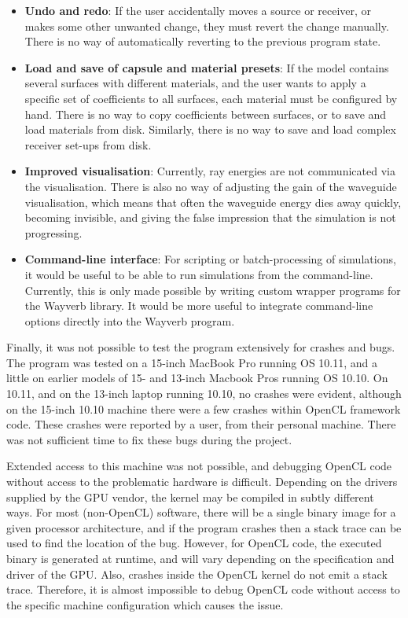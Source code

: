 \documentclass[]{scrreprt}
\providecommand{\tightlist}{%
  \setlength{\itemsep}{0pt}\setlength{\parskip}{0pt}}
\begin{document}
\begin{itemize}
\tightlist
\item
  \textbf{Undo and redo}: If the user accidentally moves a source or
  receiver, or makes some other unwanted change, they must revert the
  change manually. There is no way of automatically reverting to the
  previous program state.
\item
  \textbf{Load and save of capsule and material presets}: If the model
  contains several surfaces with different materials, and the user wants
  to apply a specific set of coefficients to all surfaces, each material
  must be configured by hand. There is no way to copy coefficients
  between surfaces, or to save and load materials from disk. Similarly,
  there is no way to save and load complex receiver set-ups from disk.
\item
  \textbf{Improved visualisation}: Currently, ray energies are not
  communicated via the visualisation. There is also no way of adjusting
  the gain of the waveguide visualisation, which means that often the
  waveguide energy dies away quickly, becoming invisible, and giving the
  false impression that the simulation is not progressing.
\item
  \textbf{Command-line interface}: For scripting or batch-processing of
  simulations, it would be useful to be able to run simulations from the
  command-line. Currently, this is only made possible by writing custom
  wrapper programs for the Wayverb library. It would be more useful to
  integrate command-line options directly into the Wayverb program.
\end{itemize}

Finally, it was not possible to test the program extensively for crashes
and bugs. The program was tested on a 15-inch MacBook Pro running OS
10.11, and a little on earlier models of 15- and 13-inch Macbook Pros
running OS 10.10. On 10.11, and on the 13-inch laptop running 10.10, no
crashes were evident, although on the 15-inch 10.10 machine there were a
few crashes within OpenCL framework code. These crashes were reported by
a user, from their personal machine. There was not sufficient time to
fix these bugs during the project.

Extended access to this machine was not possible, and debugging OpenCL
code without access to the problematic hardware is difficult. Depending
on the drivers supplied by the GPU vendor, the kernel may be compiled in
subtly different ways. For most (non-OpenCL) software, there will be a
single binary image for a given processor architecture, and if the
program crashes then a stack trace can be used to find the location of
the bug. However, for OpenCL code, the executed binary is generated at
runtime, and will vary depending on the specification and driver of the
GPU. Also, crashes inside the OpenCL kernel do not emit a stack trace.
Therefore, it is almost impossible to debug OpenCL code without access
to the specific machine configuration which causes the issue.
\end{document}
